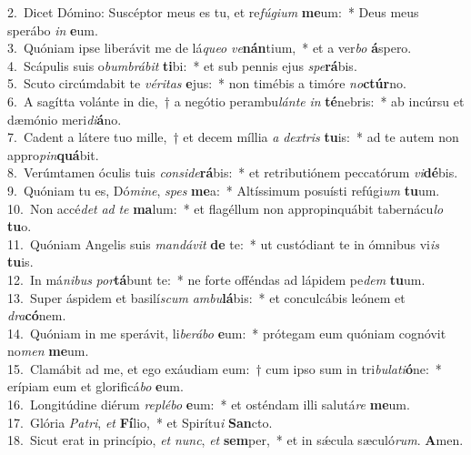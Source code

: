 {2.~}Dicet Dómino: Suscéptor meus es tu, et re\textit{fú}\textit{gi}\textit{um} \textbf{me}um:~* Deus meus sperábo \textit{in} \textbf{e}um.\\
{3.~}Quóniam ipse liberávit me de lá\textit{que}\textit{o} \textit{ve}\textbf{nán}tium,~* et a ver\textit{bo} \textbf{á}spero.\\
{4.~}Scápulis suis o\textit{bum}\textit{brá}\textit{bit} \textbf{ti}bi:~* et sub pennis ejus \textit{spe}\textbf{rá}bis.\\
{5.~}Scuto circúmdabit te \textit{vé}\textit{ri}\textit{tas} \textbf{e}jus:~* non timébis a timóre \textit{no}\textbf{ctúr}no.\\
{6.~}A sagítta volánte in die,~† a negótio perambu\textit{lán}\textit{te} \textit{in} \textbf{té}nebris:~* ab incúrsu et dæmónio meri\textit{di}\textbf{á}no.\\
{7.~}Cadent a látere tuo mille,~† et decem míllia \textit{a} \textit{dex}\textit{tris} \textbf{tu}is:~* ad te autem non appro\textit{pin}\textbf{quá}bit.\\
{8.~}Verúmtamen óculis tuis \textit{con}\textit{si}\textit{de}\textbf{rá}bis:~* et retributiónem peccatórum \textit{vi}\textbf{dé}bis.\\
{9.~}Quóniam tu es, Dó\textit{mi}\textit{ne}, \textit{spes} \textbf{me}a:~* Altíssimum posuísti refúgi\textit{um} \textbf{tu}um.\\
{10.~}Non accé\textit{det} \textit{ad} \textit{te} \textbf{ma}lum:~* et flagéllum non appropinquábit tabernácu\textit{lo} \textbf{tu}o.\\
{11.~}Quóniam Angelis suis \textit{man}\textit{dá}\textit{vit} \textbf{de} te:~* ut custódiant te in ómnibus vi\textit{is} \textbf{tu}is.\\
{12.~}In má\textit{ni}\textit{bus} \textit{por}\textbf{tá}bunt te:~* ne forte offéndas ad lápidem pe\textit{dem} \textbf{tu}um.\\
{13.~}Super áspidem et basilí\textit{scum} \textit{am}\textit{bu}\textbf{lá}bis:~* et conculcábis leónem et \textit{dra}\textbf{có}nem.\\
{14.~}Quóniam in me sperávit, li\textit{be}\textit{rá}\textit{bo} \textbf{e}um:~* prótegam eum quóniam cognóvit no\textit{men} \textbf{me}um.\\
{15.~}Clamábit ad me, et ego exáudiam eum:~† cum ipso sum in tri\textit{bu}\textit{la}\textit{ti}\textbf{ó}ne:~* erípiam eum et glorificá\textit{bo} \textbf{e}um.\\
{16.~}Longitúdine diérum \textit{re}\textit{plé}\textit{bo} \textbf{e}um:~* et osténdam illi salutá\textit{re} \textbf{me}um.\\
{17.~}Glória \textit{Pa}\textit{tri}, \textit{et} \textbf{Fí}lio,~* et Spirítu\textit{i} \textbf{San}cto.\\
{18.~}Sicut erat in princípio, \textit{et} \textit{nunc}, \textit{et} \textbf{sem}per,~* et in sǽcula sæculó\textit{rum}. \textbf{A}men.\\
